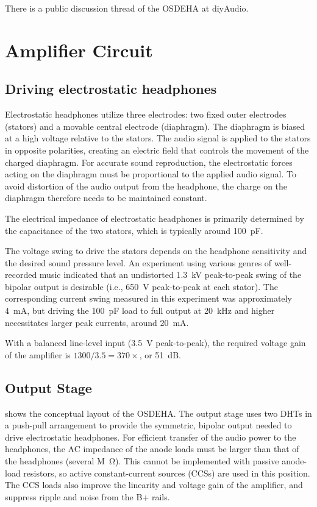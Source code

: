 There is a public discussion thread of the OSDEHA at diyAudio\cite{osdeha_p1}. 

\section{Amplifier Circuit}

\subsection{Driving electrostatic headphones} 

Electrostatic headphones utilize three electrodes: two fixed outer electrodes (stators) and a movable central electrode (diaphragm). The diaphragm is biased at a high voltage relative to the stators. The audio signal is applied to the stators in opposite polarities, creating an electric field that controls the movement of the charged diaphragm. For accurate sound reproduction, the electrostatic forces acting on the diaphragm must be proportional to the applied audio signal. To avoid distortion of the audio output from the headphone, the charge on the diaphragm therefore needs to be maintained constant.

The electrical impedance of electrostatic headphones is primarily determined by the capacitance of the two stators, which is typically around \SI{100}{pF}\cite{osdeha_p3}.

The voltage swing to drive the stators depends on the headphone sensitivity and the desired sound pressure level. An experiment using various genres of well-recorded music indicated that an undistorted \SI{1.3}{kV} peak-to-peak swing of the bipolar output is desirable (i.e., \SI{650}{V} peak-to-peak at each stator)\cite{osdeha_p8}. The corresponding current swing measured in this experiment was approximately \SI{4}{mA}, but driving the \SI{100}{pF} load to full output at \SI{20}{kHz} and higher necessitates larger peak currents, around \SI{20}{mA}\cite{osdeha_p2}.

With a balanced line-level input (\SI{3.5}{V} peak-to-peak), the required voltage gain of the amplifier is $1300/3.5 = 370\times$, or \SI{+51}{dB}.

\subsection{Output Stage}

 shows the conceptual layout of the OSDEHA. The output stage uses two DHTs in a push-pull arrangement to provide the symmetric, bipolar output needed to drive electrostatic headphones. For efficient transfer of the audio power to the headphones, the AC impedance of the anode loads must be larger than that of the headphones (several \unit{M\ohm}). This cannot be implemented with passive anode-load resistors, so active constant-current sources (CCSs) are used in this position. The CCS loads also improve the linearity and voltage gain of the amplifier, and suppress ripple and noise from the B+ rails.

